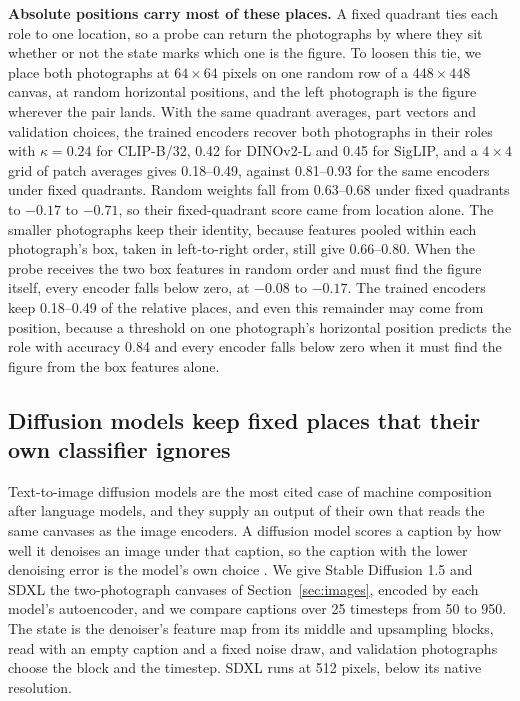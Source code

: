 \documentclass[10pt]{article}
\theoremstyle{plain}
\theoremstyle{remark}
\begin{document}
\textbf{Absolute positions carry most of these places.} A fixed quadrant ties each role to one location, so a probe can return the photographs by where they sit whether or not the state marks which one is the figure. To loosen this tie, we place both photographs at $64 \times 64$ pixels on one random row of a $448 \times 448$ canvas, at random horizontal positions, and the left photograph is the figure wherever the pair lands. With the same quadrant averages, part vectors and validation choices, the trained encoders recover both photographs in their roles with $\kappa = 0.24$ for CLIP-B/32, 0.42 for DINOv2-L and 0.45 for SigLIP, and a $4 \times 4$ grid of patch averages gives 0.18--0.49, against 0.81--0.93 for the same encoders under fixed quadrants. Random weights fall from 0.63--0.68 under fixed quadrants to $-0.17$ to $-0.71$, so their fixed-quadrant score came from location alone. The smaller photographs keep their identity, because features pooled within each photograph's box, taken in left-to-right order, still give 0.66--0.80. When the probe receives the two box features in random order and must find the figure itself, every encoder falls below zero, at $-0.08$ to $-0.17$. The trained encoders keep 0.18--0.49 of the relative places, and even this remainder may come from position, because a threshold on one photograph's horizontal position predicts the role with accuracy 0.84 and every encoder falls below zero when it must find the figure from the box features alone.

\subsection{Diffusion models keep fixed places that their own classifier ignores}
\label{sec:diffusion}

Text-to-image diffusion models are the most cited case of machine composition after language models, and they supply an output of their own that reads the same canvases as the image encoders. A diffusion model scores a caption by how well it denoises an image under that caption, so the caption with the lower denoising error is the model's own choice \citep{li2023diffclassifier,clark2023diffclassifier}. We give Stable Diffusion 1.5 and SDXL the two-photograph canvases of Section~\ref{sec:images}, encoded by each model's autoencoder, and we compare captions over 25 timesteps from 50 to 950. The state is the denoiser's feature map from its middle and upsampling blocks, read with an empty caption and a fixed noise draw, and validation photographs choose the block and the timestep. SDXL runs at 512 pixels, below its native resolution.
\end{document}
